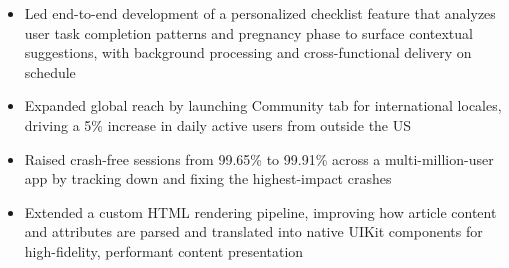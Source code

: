 \begin{itemize}
    \item Led end-to-end development of a personalized checklist feature that analyzes user task completion patterns and pregnancy phase to surface contextual suggestions, with background processing and cross-functional delivery on schedule
    \item Expanded global reach by launching Community tab for international locales, driving a 5\% increase in daily active users from outside the US
    \item Raised crash-free sessions from 99.65\% to 99.91\% across a multi-million-user app by tracking down and fixing the highest-impact crashes
    \item Extended a custom HTML rendering pipeline, improving how article content and attributes are parsed and translated into native UIKit components for high-fidelity, performant content presentation
\end{itemize}